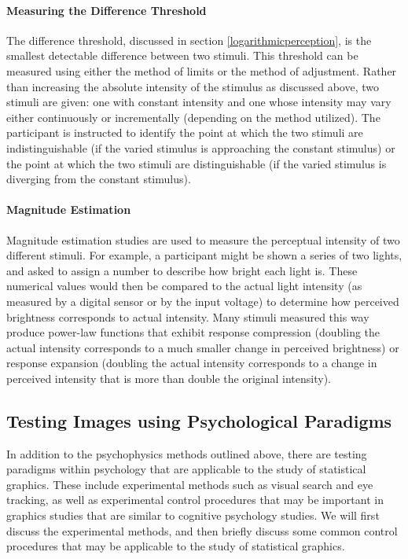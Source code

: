 \documentclass[11pt]{isuthesis}\usepackage[]{graphicx}\usepackage[]{color}
\begin{document}
\paragraph{Measuring the Difference Threshold} The difference threshold, discussed in section \ref{logarithmicperception}, is the smallest detectable difference between two stimuli. This threshold can be measured using either the method of limits or the method of adjustment. Rather than increasing the absolute intensity of the stimulus as discussed above, two stimuli are given: one with constant intensity and one whose intensity may vary either continuously or incrementally (depending on the method utilized). The participant is instructed to identify the point at which the two stimuli are indistinguishable (if the varied stimulus is approaching the constant stimulus) or the point at which the two stimuli are distinguishable (if the varied stimulus is diverging from the constant stimulus). 

\paragraph{Magnitude Estimation} Magnitude estimation studies are used to measure the perceptual intensity of two different stimuli. For example, a participant might be shown a series of two lights, and asked to assign a number to describe how bright each light is. These numerical values would then be compared to the actual light intensity (as measured by a digital sensor or by the input voltage) to determine how perceived brightness corresponds to actual intensity. Many stimuli measured this way produce power-law functions that exhibit response compression (doubling the actual intensity corresponds to a much smaller change in perceived brightness) or response expansion (doubling the actual intensity corresponds to a change in perceived intensity that is more than double the original intensity). 

\subsection{Testing Images using Psychological Paradigms}
In addition to the psychophysics methods outlined above, there are testing paradigms within psychology that are applicable to the study of statistical graphics. These include experimental methods such as visual search and eye tracking, as well as experimental control procedures that may be important in graphics studies that are similar to cognitive psychology studies. We will first discuss the experimental methods, and then briefly discuss some common control procedures that may be applicable to the study of statistical graphics. 
\end{document}
